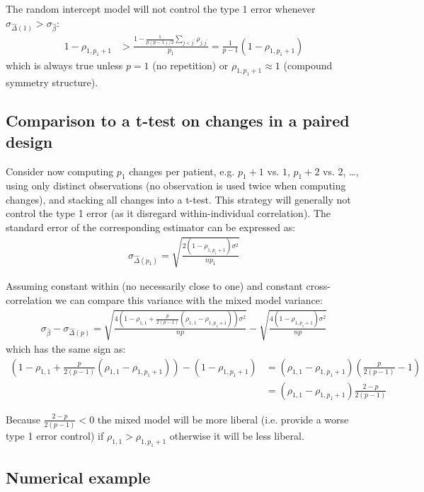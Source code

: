 \documentclass[12pt]{article}
\begin{document}
\noindent The random intercept model will not control the type 1 error
whenever \(\sigma_{\widehat{\Delta}(1)}>\sigma_{\widehat{\beta}}\):
\begin{align*}
1-\rho_{1,p_1+1} &> \frac{1-\frac{1}{p(p-1)/2}\sum_{j < j^{\prime}} \rho_{j,j^{\prime}}}{p_1} = \frac{1}{p-1}(1-\rho_{1,p_1+1})
\end{align*}
which is always true unless \(p=1\) (no repetition) or \(\rho_{1,p_1+1}\approx 1\) (compound symmetry structure).

\subsection{Comparison to a t-test on changes in a paired design}
\label{sec:orgfe9b217}

Consider now computing \(p_1\) changes per patient, e.g. \(p_1+1\)
vs. \(1\), \(p_1+2\) vs. \(2\), \ldots, using only distinct
observations (no observation is used twice when computing changes),
and stacking all changes into a t-test. This strategy will generally
not control the type 1 error (as it disregard within-individual
correlation). The standard error of the corresponding estimator can be
expressed as:
\begin{align*}
\sigma_{\widehat{\Delta}(p_1)} = \sqrt{\frac{2(1-\rho_{1,p_1+1}) \sigma^2}{np_1}}
\end{align*}

Assuming constant within (no necessarily close to one) and constant
cross-correlation we can compare this variance with the mixed model
variance:
\begin{align*}
\sigma_{\widehat{\beta}} - \sigma_{\widehat{\Delta}(p)} = \sqrt{\frac{4\left(1-\rho_{1,1} + \frac{p}{2(p-1)}(\rho_{1,1}-\rho_{1,p_1+1})\right) \sigma^2}{n p}} -  \sqrt{\frac{4(1-\rho_{1,p_1+1}) \sigma^2}{np}}
\end{align*}
which has the same sign as:
\begin{align*}
\left(1-\rho_{1,1} + \frac{p}{2(p-1)}(\rho_{1,1}-\rho_{1,p_1+1})\right) - (1-\rho_{1,p_1+1})
& = (\rho_{1,1}-\rho_{1,p_1+1}) \left(\frac{p}{2(p-1)} - 1 \right) \\
& = (\rho_{1,1}-\rho_{1,p_1+1}) \frac{2-p}{2(p-1)} 
\end{align*}

Because \(\frac{2-p}{2(p-1)}<0\) the mixed model will be more liberal
(i.e. provide a worse type 1 error control) if
\(\rho_{1,1}>\rho_{1,p_1+1}\) otherwise it will be less liberal.

\subsection{Numerical example}
\label{sec:orgb701c29}
\end{document}
